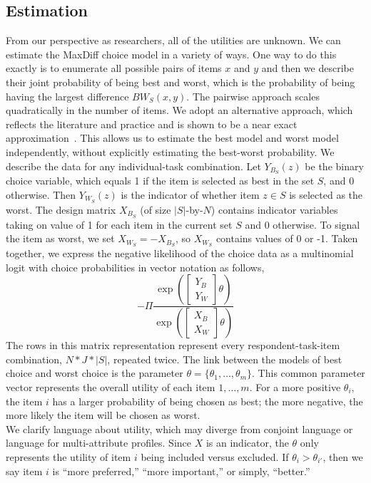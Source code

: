 \documentclass[nonblindrev]{informs3}
\begin{document}
\subsection{Estimation}
From our perspective as researchers, all of the utilities are unknown. We can estimate the MaxDiff choice model in a variety of ways. One way to do this exactly is to enumerate all possible pairs of items $x$ and $y$ and then we describe their joint probability of being best and worst, which is the probability of being having the largest difference $BW_S(x,y)$. The pairwise approach scales quadratically in the number of items. We adopt an alternative approach, which reflects the literature and practice and is shown to be a near exact approximation~\cite{cohen2003maximum}. This allows us to estimate the best model and worst model independently, without explicitly estimating the best-worst probability. 
We describe the data for any individual-task combination. Let $Y_{B_S}(z)$ be the binary choice variable, which equals 1 if the item is selected as best in the set $S$, and 0 otherwise. Then $Y_{W_S}(z)$ is the indicator of whether item $z \in S$ is selected as the worst. The design matrix $X_{B_S}$ (of size $|S|$-by-$N$) contains indicator variables taking on value of 1 for each item in the current set $S$ and 0 otherwise. To signal the item as worst, we set $X_{W_S}=-X_{B_S}$, so $X_{W_S}$ contains values of 0 or -1.  Taken together, we express the negative likelihood of the choice data as a multinomial logit with choice probabilities in vector notation as follows,
\[
-\Pi\frac{\exp{(\begin{bmatrix}Y_B\\Y_W\end{bmatrix}\theta)}}{\exp{(\begin{bmatrix}X_B\\X_W\end{bmatrix}\theta)}}
\]
The rows in this matrix representation represent every respondent-task-item combination, $N*J*|S|$, repeated twice.  
The link between the models of best choice and worst choice is the parameter $\theta=\{\theta_1,\ldots,\theta_m \}$. This common parameter vector represents the overall utility of each item $1,\ldots,m$. For a more positive $\theta_i$, the item $i$ has a larger probability of being chosen as best; the more negative, the more likely the item will be chosen as worst.\\
We clarify language about utility, which may diverge from conjoint language or language for multi-attribute profiles. Since $X$ is an indicator, the $\theta$ only represents the utility of item $i$ being included versus excluded. If $\theta_i > \theta_{i'}$, then we say item $i$ is ``more preferred,'' ``more important,'' or simply, ``better.''\\
\end{document}
